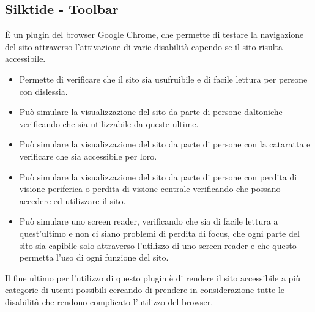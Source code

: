 \subsection{Silktide - Toolbar}
È un plugin del browser Google Chrome, che permette di testare la navigazione del sito attraverso l'attivazione di varie disabilità capendo se il sito risulta accessibile.
\begin{itemize}
	\item Permette di verificare che il sito sia usufruibile e di facile 	lettura per persone con dislessia.
	\item Può simulare la visualizzazione del sito da parte di persone daltoniche verificando che sia utilizzabile da queste ultime.
	\item Può simulare la visualizzazione del sito da parte di persone con la cataratta e verificare che sia accessibile per loro.
	\item Può simulare la visualizzazione del sito da parte di persone con perdita di visione periferica o perdita di visione centrale verificando che possano accedere ed utilizzare il sito.
	\item Può simulare uno screen reader, verificando che sia di facile lettura a quest'ultimo e non ci siano problemi di perdita di focus, che ogni parte del sito sia capibile solo attraverso l'utilizzo di uno screen reader e che questo permetta l'uso di ogni funzione del sito.
\end{itemize}
Il fine ultimo per l'utilizzo di questo plugin è di rendere il sito accessibile a più categorie di utenti possibili cercando di prendere in considerazione tutte le disabilità che rendono complicato l'utilizzo del browser.\\